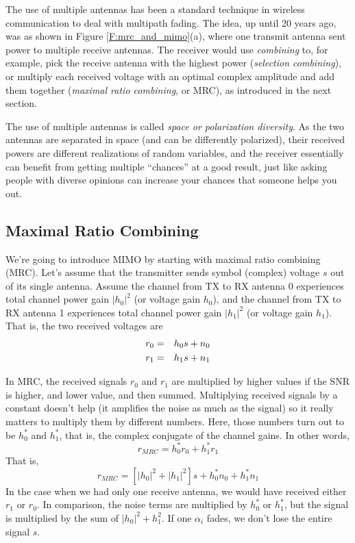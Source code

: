 The use of multiple antennas has been a standard technique in wireless communication to deal with multipath fading.  The idea, up until 20 years ago, was as shown in Figure \ref{F:mrc_and_mimo}(a), where one transmit antenna sent power to multiple receive antennas.  The receiver would use \emph{combining} to, for example, pick the receive antenna with the highest power (\textit{selection combining}), or multiply each received voltage with an optimal complex amplitude and add them together (\textit{maximal ratio combining}, or MRC), as introduced in the next section.

The use of multiple antennas is called \textit{space or polarization diversity}.  As the two antennas are separated in space (and can be differently polarized), their received powers are different realizations of random variables, and the receiver essentially can benefit from getting multiple ``chances'' at a good result, just like asking people with diverse opinions can increase your chances that someone helps you out.




\subsection{ Maximal Ratio Combining}

We're going to introduce MIMO by starting with maximal ratio combining (MRC). Let's assume that the transmitter sends symbol (complex) voltage $s$ out of its single antenna.  Assume the channel from TX to RX antenna 0 experiences total channel power gain $|h_0|^2$ (or voltage gain $h_0$), and the channel from TX to RX antenna 1 experiences total channel power gain $|h_1|^2$ (or voltage gain $h_1$).  That is, the two received voltages are
\begin{eqnarray} \label{E:TX_Signal}
 r_0 &=& h_0 s + n_0 \nonumber \\ 
 r_1 &=& h_1 s + n_1 
\end{eqnarray}

In MRC, the received signals $r_0$ and $r_1$ are multiplied by higher values if the SNR is higher, and lower value, and then summed.  Multiplying received signals by a constant doesn't help (it amplifies the noise as much as the signal) so it really matters to multiply them by different numbers.  Here, those numbers turn out to be $h_0^*$ and $h_1^*$, that is, the complex conjugate of the channel gains.  In other words,
\[
 r_{MRC} = h_0^* r_0 + h_1^* r_1 
\]
That is,
\[
 r_{MRC} = \left[ |h_0|^2 + |h_1|^2 \right] s + h_0^* n_0 + h_1^* n_1
\]
In the case when we had only one receive antenna, we would have received either $r_1$ or $r_0$.  In comparison, the noise terms are multiplied by $h_0^*$ or $h_1^*$, but the signal is multiplied by the sum of $|h_0|^2 + h_1^2$.  If one $\alpha_i$ fades, we don't lose the entire signal $s$.

